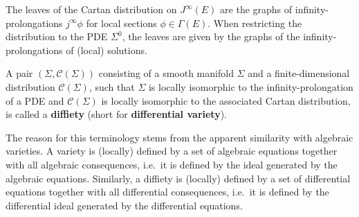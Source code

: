     \begin{property}[Diffiety]\label{var:diffiety}
        The leaves of the Cartan distribution on $J^\infty(E)$ are the graphs of infinity-prolongations $j^\infty\phi$ for local sections $\phi\in\Gamma(E)$. When restricting the distribution to the PDE $\Sigma^0$, the leaves are given by the graphs of the infinity-prolongations of (local) solutions.

        A pair $(\Sigma,\mathcal{C}(\Sigma))$ consisting of a smooth manifold $\Sigma$ and a finite-dimensional distribution $\mathcal{C}(\Sigma)$, such that $\Sigma$ is locally isomorphic to the infinity-prolongation of a PDE and $\mathcal{C}(\Sigma)$ is locally isomorphic to the associated Cartan distribution, is called a \textbf{diffiety} (short for \textbf{differential variety}).
    \end{property}
    \begin{remark}
        The reason for this terminology stems from the apparent similarity with algebraic varieties. A variety is (locally) defined by a set of algebraic equations together with all algebraic consequences, i.e.~it is defined by the ideal generated by the algebraic equations. Similarly, a diffiety is (locally) defined by a set of differential equations together with all differential consequences, i.e.~it is defined by the differential ideal generated by the differential equations.
    \end{remark}



